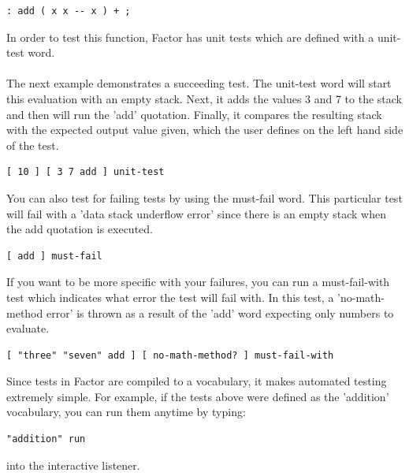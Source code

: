 \documentclass{sig-alternate}
\begin{document}
\begin{verbatim}
: add ( x x -- x ) + ;
\end{verbatim}

In order to test this function, Factor has unit tests which are defined with a unit-test word.
\\\\
The next example demonstrates a succeeding test.  The unit-test word will start this evaluation with an empty stack.   Next, it adds the values 3 and 7 to the stack and then will run the 'add' quotation.  Finally, it compares the resulting stack with the expected output value given, which the user defines on the left hand side of the test. 

\begin{verbatim}
[ 10 ] [ 3 7 add ] unit-test
\end{verbatim}


You can also test for failing tests by using the must-fail word.  This particular test will fail with a 'data stack underflow error' since there is an empty stack when the add quotation is executed. 

\begin{verbatim}
[ add ] must-fail
\end{verbatim}

If you want to be more specific with your failures, you can run a must-fail-with test which indicates what error the test will fail with.  In this test, a 'no-math-method error' is thrown as a result of the 'add' word expecting only numbers to evaluate.

\begin{verbatim}
[ "three" "seven" add ] [ no-math-method? ] must-fail-with
\end{verbatim}

Since tests in Factor are compiled to a vocabulary, it makes automated testing extremely simple.  For example, if the tests above were defined as the 'addition' vocabulary, you can run them anytime by typing: 

\begin{verbatim}
"addition" run
\end{verbatim}

into the interactive listener.
\\\\
\end{document}
